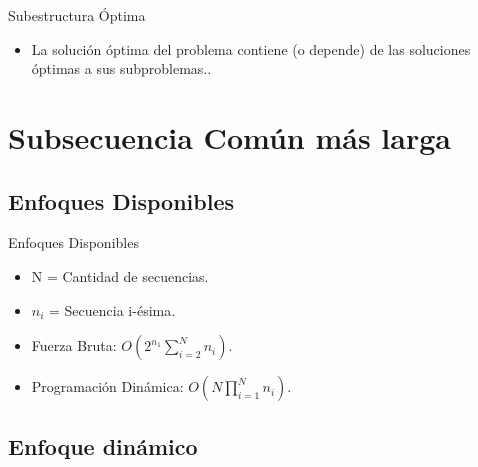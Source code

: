 \documentclass{beamer}
\begin{document}
		\begin{frame}{Subestructura Óptima}
 			\begin{itemize}
			
  				\item La solución óptima del problema contiene (o depende) de las soluciones óptimas a sus subproblemas..

			\end{itemize}
		\end{frame}
			

	\section{Subsecuencia Común más larga}

		\subsection{Enfoques Disponibles}
	
			\begin{frame}{Enfoques Disponibles}
 			
				\begin{itemize}
			
					\item N = Cantidad de secuencias.
				
					\item $n_{i} $ = Secuencia i-ésima.

  					\item Fuerza Bruta: $O(2^{n_{1}}\sum_{i = 2}^{N}n_{i})$.
  			
					\item Programación Dinámica: $O(N\prod_{i = 1}^{N}n_{i})$.
  					
				\end{itemize}
			
			\end{frame}

		\subsection{Enfoque dinámico}
		
\end{document}
